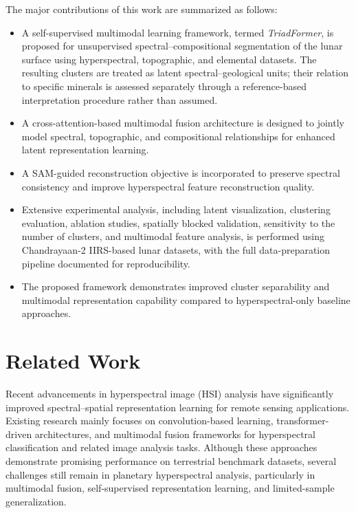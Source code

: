 \documentclass[pdflatex,sn-mathphys-num]{sn-jnl}
\begin{document}
The major contributions of this work are summarized as follows:

\begin{itemize}

\item A self-supervised multimodal learning framework, termed \textit{TriadFormer}, is proposed for unsupervised spectral--compositional segmentation of the lunar surface using hyperspectral, topographic, and elemental datasets. The resulting clusters are treated as latent spectral--geological units; their relation to specific minerals is assessed separately through a reference-based interpretation procedure rather than assumed.

\item A cross-attention-based multimodal fusion architecture is designed to jointly model spectral, topographic, and compositional relationships for enhanced latent representation learning.

\item A SAM-guided reconstruction objective is incorporated to preserve spectral consistency and improve hyperspectral feature reconstruction quality.

\item Extensive experimental analysis, including latent visualization, clustering evaluation, ablation studies, spatially blocked validation, sensitivity to the number of clusters, and multimodal feature analysis, is performed using Chandrayaan-2 IIRS-based lunar datasets, with the full data-preparation pipeline documented for reproducibility.

\item The proposed framework demonstrates improved cluster separability and multimodal representation capability compared to hyperspectral-only baseline approaches.

\end{itemize}



\section{Related Work}

Recent advancements in hyperspectral image (HSI) analysis have significantly improved spectral--spatial representation learning for remote sensing applications. Existing research mainly focuses on convolution-based learning, transformer-driven architectures, and multimodal fusion frameworks for hyperspectral classification and related image analysis tasks. Although these approaches demonstrate promising performance on terrestrial benchmark datasets, several challenges still remain in planetary hyperspectral analysis, particularly in multimodal fusion, self-supervised representation learning, and limited-sample generalization.
\end{document}
